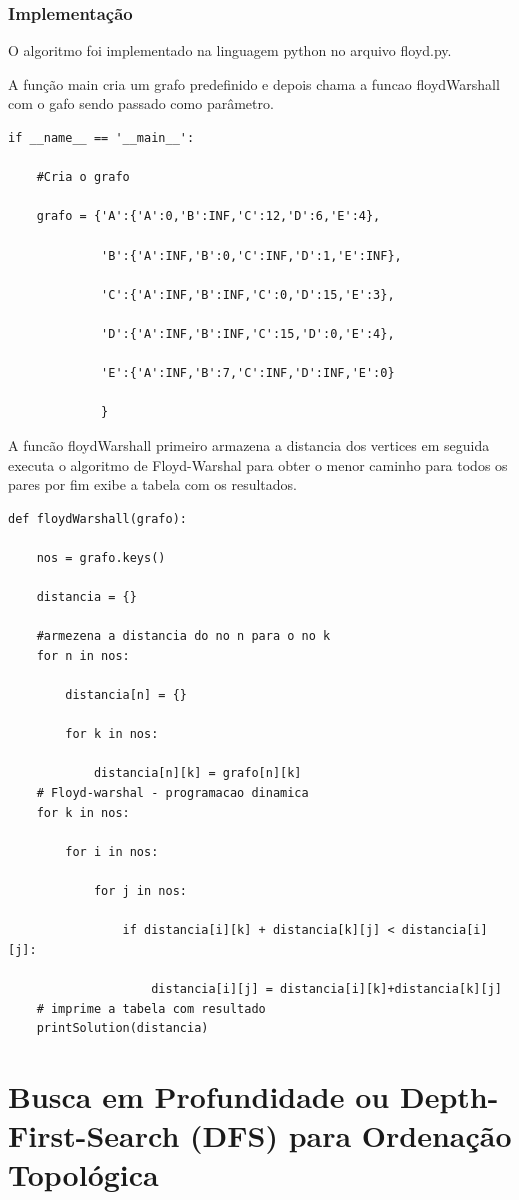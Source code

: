 \documentclass[a4paper,12pt]{article}
\begin{document}
\subsubsection{Implementação}
O algoritmo foi implementado na linguagem python no arquivo floyd.py.

A função main cria um grafo predefinido e depois chama a funcao floydWarshall com o gafo sendo passado como parâmetro.
\begin{lstlisting}
if __name__ == '__main__':
	
	#Cria o grafo

    grafo = {'A':{'A':0,'B':INF,'C':12,'D':6,'E':4},

             'B':{'A':INF,'B':0,'C':INF,'D':1,'E':INF},

             'C':{'A':INF,'B':INF,'C':0,'D':15,'E':3},

             'D':{'A':INF,'B':INF,'C':15,'D':0,'E':4},

             'E':{'A':INF,'B':7,'C':INF,'D':INF,'E':0}

             }
\end{lstlisting}
 
A funcão floydWarshall primeiro armazena a distancia dos vertices em seguida executa o algoritmo de Floyd-Warshal para obter o menor caminho para todos os pares por fim exibe a tabela com os resultados.
\begin{lstlisting}
def floydWarshall(grafo):

    nos = grafo.keys()

    distancia = {}
	
	#armezena a distancia do no n para o no k
    for n in nos:

        distancia[n] = {}

        for k in nos:

            distancia[n][k] = grafo[n][k]
	# Floyd-warshal - programacao dinamica
    for k in nos:

        for i in nos:

            for j in nos:

                if distancia[i][k] + distancia[k][j] < distancia[i][j]:

                    distancia[i][j] = distancia[i][k]+distancia[k][j]
	# imprime a tabela com resultado
    printSolution(distancia)
\end{lstlisting}

\newpage
\section{Busca em Profundidade ou Depth-First-Search (DFS) para Ordenação Topológica}
\end{document}
